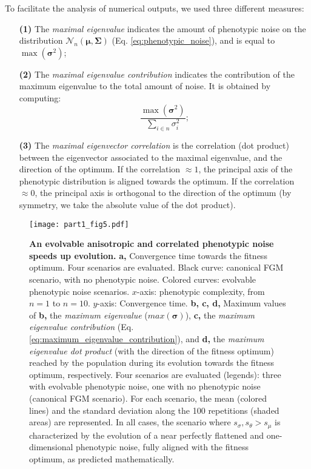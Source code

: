 To facilitate the analysis of numerical outputs, we used three different measures:
\begin{enumerate}
\item[\textbf{(1)}] The \textit{maximal eigenvalue} indicates the amount of phenotypic noise on the distribution $\mathcal{N}_n(\boldsymbol{\mu},\boldsymbol{\Sigma})$ (Eq. \ref{eq:phenotypic_noise}), and is equal to $\max(\boldsymbol{\sigma}^2)$;
\item[\textbf{(2)}] The \textit{maximal eigenvalue contribution} indicates the contribution of the maximum eigenvalue to the total amount of noise. It is obtained by computing:
\begin{equation}
\dfrac{\max(\boldsymbol{\sigma}^2)}{\sum\limits_{i \in n} \sigma_i^2};
\label{eq:maximum_eigenvalue_contribution}
\end{equation}
\item[\textbf{(3)}] The \textit{maximal eigenvector correlation} is the correlation (dot product) between the eigenvector associated to the maximal eigenvalue, and the direction of the optimum. If the correlation $\approx 1$, the principal axis of the phenotypic distribution is aligned towards the optimum. If the correlation $\approx 0$, the principal axis is orthogonal to the direction of the optimum (by symmetry, we take the absolute value of the dot product).
\end{enumerate}

\begin{figure}[!h]
\begin{adjustwidth}{-0in}{0in}
\centering
\texttt{[image: part1\_fig5.pdf]}
\end{adjustwidth}
\caption[An evolvable anisotropic and correlated phenotypic noise speeds up evolution.]{\textbf{An evolvable anisotropic and correlated phenotypic noise speeds up evolution.}
\textbf{a,} Convergence time towards the fitness optimum. Four scenarios are evaluated. Black curve: canonical FGM scenario, with no phenotypic noise. Colored curves: evolvable phenotypic noise scenarios. $x$-axis: phenotypic complexity, from $n=1$ to $n=10$. $y$-axis: Convergence time.
\textbf{b, c, d,} Maximum values of \textbf{b,} the \textit{maximum eigenvalue} ($max(\boldsymbol{\sigma})$), \textbf{c,} the \textit{maximum eigenvalue contribution} (Eq. \ref{eq:maximum_eigenvalue_contribution}), and \textbf{d,} the \textit{maximum eigenvalue dot product} (with the direction of the fitness optimum) reached by the population during its evolution towards the fitness optimum, respectively. Four scenarios are evaluated (legends): three with evolvable phenotypic noise, one with no phenotypic noise (canonical FGM scenario). For each scenario, the mean (colored lines) and the standard deviation along the 100 repetitions (shaded areas) are represented. In all cases, the scenario where $s_\sigma, s_\theta >  s_\mu$ is characterized by the evolution of a near perfectly flattened and one-dimensional phenotypic noise, fully aligned with the fitness optimum, as predicted mathematically.
}
\label{part1:fig5}
\end{figure}

